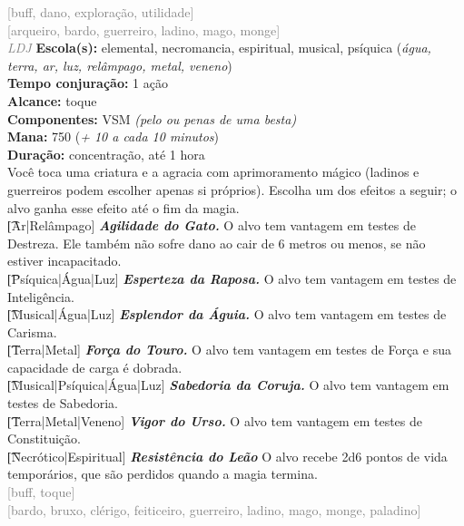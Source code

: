 \documentclass{RPG_Adventure}[2021/10/20]
\begin{document}
{\scriptsize \textcolor{gray}{[buff, dano, exploração, utilidade]\\}}
{\scriptsize \textcolor{gray}{[arqueiro, bardo, guerreiro, ladino, mago, monge]\\}}
{\tiny \textcolor{gray}{\textit{LDJ}}}
{\small \t \textbf{Escola(s):} elemental, necromancia, espiritual, musical, psíquica (\textit{água, terra, ar, luz, relâmpago, metal, veneno})\\\t \textbf{Tempo conjuração:} 1 ação\\\t \textbf{Alcance:} toque\\\t \textbf{Componentes:} VSM \textit{(pelo ou penas de uma besta)}\\\t \textbf{Mana:} 750 (\textit{+ 10 a cada 10 minutos})\\\t \textbf{Duração:} concentração, até 1 hora\\}
{\normalsize Você toca uma criatura e a agracia com aprimoramento mágico (ladinos e guerreiros podem escolher apenas si próprios). Escolha um dos efeitos a seguir; o alvo ganha esse efeito até o fim da magia.\\\t [Ar|Relâmpago] \textbf{\textit{Agilidade do Gato.}} O alvo tem vantagem em testes de Destreza. Ele também não sofre dano ao cair de 6 metros ou menos, se não estiver incapacitado.\\\t [Psíquica|Água|Luz] \textbf{\textit{Esperteza da Raposa.}} O alvo tem vantagem em testes de Inteligência.\\\t [Musical|Água|Luz] \textbf{\textit{Esplendor da Águia.}} O alvo tem vantagem em testes de Carisma.\\\t [Terra|Metal] \textbf{\textit{Força do Touro.}} O alvo tem vantagem em testes de Força e sua capacidade de carga é dobrada.  \\\t [Musical|Psíquica|Água|Luz] \textbf{\textit{Sabedoria da Coruja.}} O alvo tem vantagem em testes de Sabedoria.\\\t [Terra|Metal|Veneno] \textbf{\textit{Vigor do Urso.}} O alvo tem vantagem em testes de Constituição.\\\t [Necrótico|Espiritual] \textbf{\textit{Resistência do Leão}} O alvo recebe 2d6 pontos de vida temporários, que são perdidos quando a magia termina.\\}
{\scriptsize \textcolor{gray}{[buff, toque]\\}}
{\scriptsize \textcolor{gray}{[bardo, bruxo, clérigo, feiticeiro, guerreiro, ladino, mago, monge, paladino]\\}}
\end{document}
